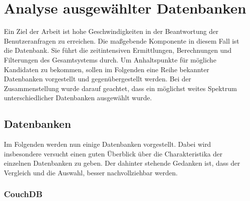 \chapter{Analyse ausgewählter Datenbanken}
\label{ch:AnalyseDatenbanken}

Ein Ziel der Arbeit ist hohe Geschwindigkeiten in der Beantwortung der Benutzeranfragen zu erreichen. Die maßgebende Komponente in diesem Fall ist die Datenbank. Sie führt die zeitintensiven Ermittlungen, Berechnungen und Filterungen des Gesamtsystems durch. Um Anhaltspunkte für mögliche Kandidaten zu bekommen, sollen im Folgenden eine Reihe bekannter Datenbanken vorgestellt und gegenübergestellt werden. Bei der Zusammenstellung wurde darauf geachtet, dass ein möglichst weites Spektrum unterschiedlicher Datenbanken ausgewählt wurde.

\section{Datenbanken}
\label{ch:AnalyseDatenbanken:sec:Datenbanken}

Im Folgenden werden nun einige Datenbanken vorgestellt. Dabei wird insbesondere versucht einen guten Überblick über die Charakteristika der einzelnen Datenbanken zu geben. Der dahinter stehende Gedanken ist, dass der Vergleich und die Auswahl, besser nachvollziehbar werden. 

\subsection{CouchDB}
\label{ch:AnalyseDatenbanken:sec:Datenbanken:subsec:CouchDB}

